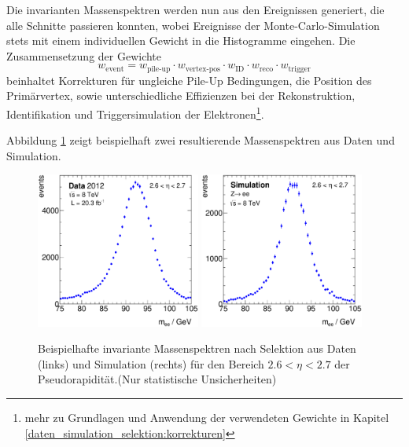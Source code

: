 Die invarianten Massenspektren werden nun aus den Ereignissen generiert, die
alle Schnitte passieren konnten, wobei Ereignisse der Monte-Carlo-Simulation
stets mit einem individuellen Gewicht in die Histogramme eingehen. Die
Zusammensetzung der Gewichte 
\begin{equation}
    w_\text{event} = w_\text{pile-up} \cdot w_\text{vertex-pos} \cdot
                     w_\text{ID} \cdot w_\text{reco} \cdot w_\text{trigger}
    \label{eq:calibration_weights}
\end{equation}
beinhaltet Korrekturen für ungleiche Pile-Up Bedingungen, die Position des
Primärvertex, sowie unterschiedliche Effizienzen bei der Rekonstruktion,
Identifikation und Triggersimulation der Elektronen\footnote{mehr zu Grundlagen
und Anwendung der verwendeten Gewichte in Kapitel
\ref{daten_simulation_selektion:korrekturen}}.

Abbildung \ref{fig:example_mee_p26} zeigt beispielhaft zwei resultierende
Massenspektren aus Daten und Simulation.

\begin{figure}
    \centering
    \includegraphics[width=0.48\textwidth]{plots/example_mee_data_p26}
    \hfill
    \includegraphics[width=0.48\textwidth]{plots/example_mee_mc_p26}
    \caption[Beispielhafte invariante Massenspektren nach Selektion aus Daten
        und Simulation für den Bereich $2.6 < \eta < 2.7$ der Pseudorapidität]
        {Beispielhafte invariante Massenspektren nach Selektion aus Daten
        (links) und Simulation (rechts) für den Bereich $2.6 < \eta < 2.7$ der
            Pseudorapidität.(Nur statistische Unsicherheiten)}
    \label{fig:example_mee_p26}
\end{figure}

